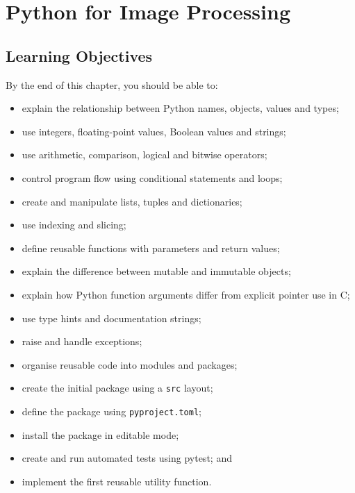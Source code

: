 
\chapter{Python for Image Processing}
\label{ch:python-for-image-processing}


\section{Learning Objectives}
\label{sec:ch03-learning-objectives}

By the end of this chapter, you should be able to:

\begin{itemize}
    \item explain the relationship between Python names, objects,
    values and types;
    \item use integers, floating-point values, Boolean values and
    strings;
    \item use arithmetic, comparison, logical and bitwise operators;
    \item control program flow using conditional statements and loops;
    \item create and manipulate lists, tuples and dictionaries;
    \item use indexing and slicing;
    \item define reusable functions with parameters and return values;
    \item explain the difference between mutable and immutable
    objects;
    \item explain how Python function arguments differ from explicit
    pointer use in C;
    \item use type hints and documentation strings;
    \item raise and handle exceptions;
    \item organise reusable code into modules and packages;
    \item create the initial \pyimage{} package using a
    \texttt{src} layout;
    \item define the package using \texttt{pyproject.toml};
    \item install the package in editable mode;
    \item create and run automated tests using pytest; and
    \item implement the first reusable \pyimage{} utility function.
\end{itemize}


